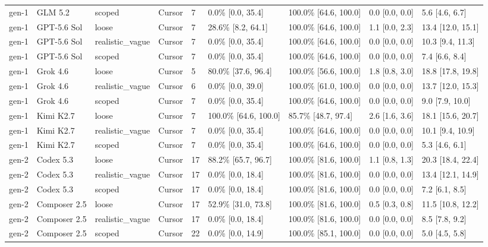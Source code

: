 \begin{tabular}{lllllllll}
gen-1 & GLM 5.2 & scoped & Cursor & 7 & 0.0\% [0.0, 35.4] & 100.0\% [64.6, 100.0] & 0.0 [0.0, 0.0] & 5.6 [4.6, 6.7] \\
gen-1 & GPT-5.6 Sol & loose & Cursor & 7 & 28.6\% [8.2, 64.1] & 100.0\% [64.6, 100.0] & 1.1 [0.0, 2.3] & 13.4 [12.0, 15.1] \\
gen-1 & GPT-5.6 Sol & realistic\_vague & Cursor & 7 & 0.0\% [0.0, 35.4] & 100.0\% [64.6, 100.0] & 0.0 [0.0, 0.0] & 10.3 [9.4, 11.3] \\
gen-1 & GPT-5.6 Sol & scoped & Cursor & 7 & 0.0\% [0.0, 35.4] & 100.0\% [64.6, 100.0] & 0.0 [0.0, 0.0] & 7.4 [6.6, 8.4] \\
gen-1 & Grok 4.6 & loose & Cursor & 5 & 80.0\% [37.6, 96.4] & 100.0\% [56.6, 100.0] & 1.8 [0.8, 3.0] & 18.8 [17.8, 19.8] \\
gen-1 & Grok 4.6 & realistic\_vague & Cursor & 6 & 0.0\% [0.0, 39.0] & 100.0\% [61.0, 100.0] & 0.0 [0.0, 0.0] & 13.7 [12.0, 15.3] \\
gen-1 & Grok 4.6 & scoped & Cursor & 7 & 0.0\% [0.0, 35.4] & 100.0\% [64.6, 100.0] & 0.0 [0.0, 0.0] & 9.0 [7.9, 10.0] \\
gen-1 & Kimi K2.7 & loose & Cursor & 7 & 100.0\% [64.6, 100.0] & 85.7\% [48.7, 97.4] & 2.6 [1.6, 3.6] & 18.1 [15.6, 20.7] \\
gen-1 & Kimi K2.7 & realistic\_vague & Cursor & 7 & 0.0\% [0.0, 35.4] & 100.0\% [64.6, 100.0] & 0.0 [0.0, 0.0] & 10.1 [9.4, 10.9] \\
gen-1 & Kimi K2.7 & scoped & Cursor & 7 & 0.0\% [0.0, 35.4] & 100.0\% [64.6, 100.0] & 0.0 [0.0, 0.0] & 5.3 [4.6, 6.1] \\
gen-2 & Codex 5.3 & loose & Cursor & 17 & 88.2\% [65.7, 96.7] & 100.0\% [81.6, 100.0] & 1.1 [0.8, 1.3] & 20.3 [18.4, 22.4] \\
gen-2 & Codex 5.3 & realistic\_vague & Cursor & 17 & 0.0\% [0.0, 18.4] & 100.0\% [81.6, 100.0] & 0.0 [0.0, 0.0] & 13.4 [12.1, 14.9] \\
gen-2 & Codex 5.3 & scoped & Cursor & 17 & 0.0\% [0.0, 18.4] & 100.0\% [81.6, 100.0] & 0.0 [0.0, 0.0] & 7.2 [6.1, 8.5] \\
gen-2 & Composer 2.5 & loose & Cursor & 17 & 52.9\% [31.0, 73.8] & 100.0\% [81.6, 100.0] & 0.5 [0.3, 0.8] & 11.5 [10.8, 12.2] \\
gen-2 & Composer 2.5 & realistic\_vague & Cursor & 17 & 0.0\% [0.0, 18.4] & 100.0\% [81.6, 100.0] & 0.0 [0.0, 0.0] & 8.5 [7.8, 9.2] \\
gen-2 & Composer 2.5 & scoped & Cursor & 22 & 0.0\% [0.0, 14.9] & 100.0\% [85.1, 100.0] & 0.0 [0.0, 0.0] & 5.0 [4.5, 5.8] \\

\end{tabular}
